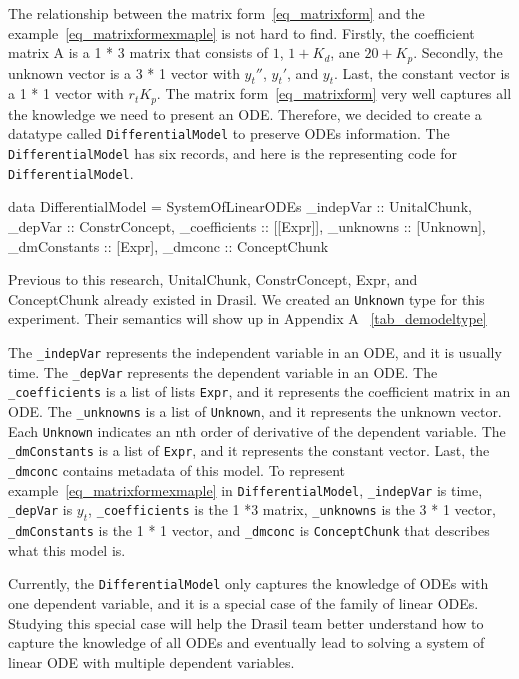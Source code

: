 The relationship between the matrix form~\ref{eq_matrixform} and the example~\ref{eq_matrixformexmaple} is not hard to find. Firstly, the coefficient matrix A is a 1 * 3 matrix that consists of $1$, $1 + K_d$, ane $20 + K_p$. Secondly, the unknown vector is a 3 * 1 vector with $y_t''$, $y_t'$, and $y_t$. Last, the constant vector is a 1 * 1 vector with $r_t K_p$. The matrix form~\ref{eq_matrixform} very well captures all the knowledge we need to present an ODE. Therefore, we decided to create a datatype called \verb|DifferentialModel| to preserve ODEs information. The \verb|DifferentialModel| has six records, and here is the representing code for \verb|DifferentialModel|.
\begin{haskell1}
data DifferentialModel = SystemOfLinearODEs {
	_indepVar :: UnitalChunk,
	_depVar :: ConstrConcept,
	_coefficients :: [[Expr]],
	_unknowns :: [Unknown],
	_dmConstants :: [Expr],
	_dmconc :: ConceptChunk
}
\end{haskell1}

Previous to this research, UnitalChunk, ConstrConcept, Expr, and ConceptChunk already existed in Drasil. We created an \verb|Unknown| type for this experiment. Their semantics will show up in Appendix A ~\ref{tab_demodeltype}

The \verb|_indepVar| represents the independent variable in an ODE, and it is usually time. The \verb|_depVar| represents the dependent variable in an ODE. The \verb|_coefficients| is a list of lists \verb|Expr|, and it represents the coefficient matrix in an ODE. The \verb|_unknowns| is a list of \verb|Unknown|, and it represents the unknown vector. Each \verb|Unknown| indicates an nth order of derivative of the dependent variable. The \verb|_dmConstants| is a list of \verb|Expr|, and it represents the constant vector. Last, the \verb|_dmconc| contains metadata of this model. To represent example~\ref{eq_matrixformexmaple} in \verb|DifferentialModel|, \verb|_indepVar| is time, \verb|_depVar| is $y_t$, \verb|_coefficients| is the 1 *3 matrix, \verb|_unknowns| is the 3 * 1 vector, \verb|_dmConstants| is the 1 * 1 vector, and \verb|_dmconc| is \verb|ConceptChunk| that describes what this model is.

Currently, the \verb|DifferentialModel| only captures the knowledge of ODEs with one dependent variable, and it is a special case of the family of linear ODEs. Studying this special case will help the Drasil team better understand how to capture the knowledge of all ODEs and eventually lead to solving a system of linear ODE with multiple dependent variables.

